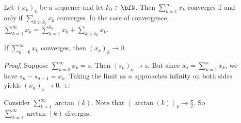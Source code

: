     \begin{proposition}
        Let $(x_k)_k$ be a sequence and let $k_0 \in \bfN$. Then $\sum_{k = 1}^\infty x_k$ converges if and only if $\sum_{k > k_0} x_k$ converges. In the case of convergence, $\sum_{k = 1}^\infty x_k = \sum_{k=1}^{k_0} x_k + \sum_{k > k_0} x_k$.
    \end{proposition}

    \begin{lemma}
        If $\sum_{k = 0}^\infty x_k$ converges, then $(x_k)_k \rightarrow 0$.
    \end{lemma}
        \begin{proof}
            Suppose $\sum_{k = 0}^\infty x_k = s$. Then $(s_n)_n \rightarrow s$. But since $s_n = \sum_{k = 1}^n x_k$, we have $s_n - s_{n-1} = x_n$. Taking the limit as $n$ approaches infinity on both sides yields $(x_n)_n \rightarrow 0$.
        \end{proof}

    \begin{example}
        Consider $\sum_{k = 1}^\infty \arctan(k)$. Note that $(\arctan(k))_k \rightarrow \frac{\pi}{2}$. So $\sum_{k = 1}^\infty \arctan(k)$ diverges.
    \end{example}